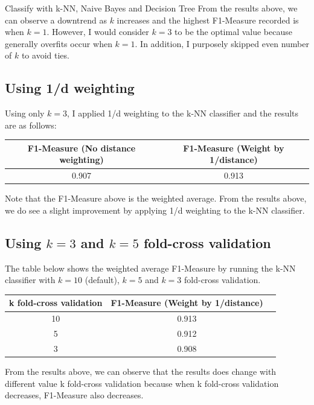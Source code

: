 \documentclass[12pt]{article}
\begin{document}
\begin{section}{Classify with k-NN, Naive Bayes and Decision Tree}
 From the results above, we can observe a downtrend as $k$ increases and the highest F1-Measure recorded is when
 $k = 1$. However, I would consider $k = 3$ to be the optimal value because generally overfits occur when $k=1$.
 In addition, I purposely skipped even number of $k$ to avoid ties.

 \subsection{Using 1/d weighting}
 Using only $k = 3$, I applied 1/d weighting to the k-NN classifier and the results are as follows:

 \begin{center}
     \begin{tabular}{| c | c |}
         \hline
         \textbf{F1-Measure (No distance weighting)} & \textbf{F1-Measure (Weight by 1/distance)} \\ [0.5ex]
         \hline
         0.907                                       & 0.913                                      \\
         \hline
     \end{tabular}
 \end{center}

 Note that the F1-Measure above is the weighted average. From the results above, we do see a slight improvement
 by applying 1/d weighting to the k-NN classifier.

 \subsection{Using $k = 3$ and $k = 5$ fold-cross validation}
 The table below shows the weighted average F1-Measure by running the k-NN classifier with $k = 10$ (default),
 $k = 5$ and $k = 3$ fold-cross validation.

 \begin{center}
     \begin{tabular}{| c | c | c |}
         \hline
         \textbf{k fold-cross validation} & \textbf{F1-Measure (Weight by 1/distance)} \\ [0.5ex]
         \hline
         10                               & 0.913                                      \\
         \hline
         5                                & 0.912                                      \\
         \hline
         3                                & 0.908                                      \\
         \hline
     \end{tabular}
 \end{center}

 From the results above, we can observe that the results does change with different value k fold-cross validation
 because when k fold-cross validation decreases, F1-Measure also decreases.
\end{section}
\end{document}
